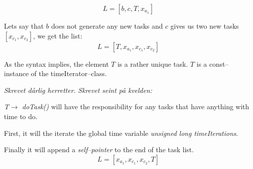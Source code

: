 \begin{equation}
	L = [b, c, T, x_{a_1}]
\end{equation}

Lets say that $b$ does not generate any new tasks and $c$ gives us two new tasks $[x_{c_1}, x_{c_2}]$, we get the list:
\begin{equation}
	L = [T, x_{a_1}, x_{c_1}, x_{c_2} ]
\end{equation}

As the syntax implies, the element $T$ is a rather unique task. $T$ is a const--instance of the timeIterator--class.


\emph{Skrevet dårlig herretter. Skrevet seint på kvelden:} %

\emph{T$\rightarrow$ doTask()} will have the responsibility for any tasks that have anything with time to do. 

First, it will the iterate the global time variable \emph{unsigned long timeIterations}.

Finally it will append a \emph{self--pointer} to the end of the task list.
\begin{equation}
	L = [x_{a_1}, x_{c_1}, x_{c_2}, T ]
\end{equation}

